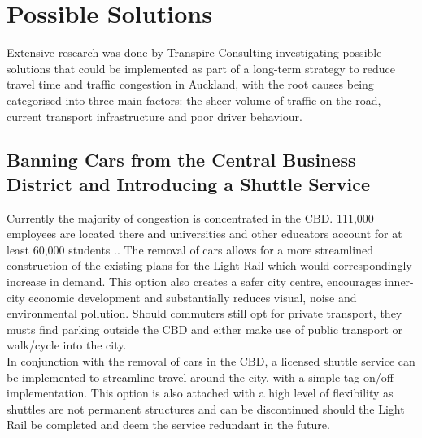 \documentclass[twoside, a4paper, 11pt]{article}
\begin{document}
\section{Possible Solutions}
Extensive research was done by Transpire Consulting investigating possible solutions that could be implemented as part of a long-term strategy to reduce travel time and traffic congestion in Auckland, with the root causes being categorised into three main factors: the sheer volume of traffic on the road, current transport infrastructure and poor driver behaviour.
 
\subsection{Banning Cars from the Central Business District and Introducing a Shuttle Service }
Currently the majority of congestion is concentrated in the CBD. 111,000 employees are located there and universities and other educators account for at least 60,000 students \citep{MattL17}.. The removal of cars allows for a more streamlined construction of the existing plans for the Light Rail which would correspondingly increase in demand. This option also creates a safer city centre, encourages inner-city economic development and substantially reduces visual, noise and environmental pollution. Should commuters still opt for private transport, they musts find parking outside the CBD and either make use of public transport or walk/cycle into the city.
\\In conjunction with the removal of cars in the CBD, a licensed shuttle service can be implemented to streamline travel around the city, with a simple tag on/off implementation. This option is also attached with a high level of flexibility as shuttles are not permanent structures and can be discontinued should the Light Rail be completed and deem the service redundant in the future.
\end{document}
